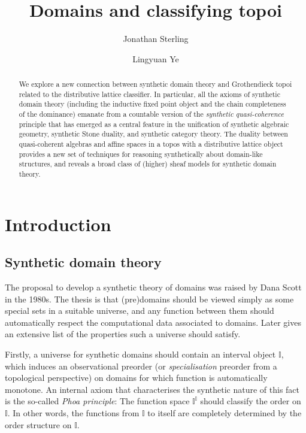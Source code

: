 \documentclass[a4paper,12pt]{amsart}
\title{Domains and classifying topoi}
\author{Jonathan Sterling}
\author{Lingyuan Ye}
\theoremstyle{definition}
\newcommand{\mbb}[1]{\mathbb{#1}}
\newcommand{\I}{\mbb I}
\begin{document}
\begin{abstract}
  We explore a new connection between synthetic domain theory and Grothendieck topoi related to the distributive lattice classifier. In particular, all the axioms of synthetic domain theory (including the inductive fixed point object and the chain completeness of the dominance) emanate from a countable version of the \emph{synthetic quasi-coherence} principle that has emerged as a central feature in the unification of synthetic algebraic geometry, synthetic Stone duality, and synthetic category theory. The duality between quasi-coherent algebras and affine spaces in a topos with a distributive lattice object provides a new set of techniques for reasoning synthetically about domain-like structures, and reveals a broad class of (higher) sheaf models for synthetic domain theory.
\end{abstract}

\maketitle
\tableofcontents


\section{Introduction}\label{sec:intro}

\subsection{Synthetic domain theory}\label{subsec:sdt}

The proposal to develop a synthetic theory of domains was raised by Dana Scott in the 1980s. The thesis is that (pre)domains should be viewed simply as some special sets in a suitable universe, and any function between them should automatically respect the computational data associated to domains. Later \citet{hyland1990first} gives an extensive list of the properties such a universe should satisfy.

Firstly, a universe for synthetic domains should contain an interval object $\I$, which induces an observational preorder (or \emph{specialisation} preorder from a topological perspective) on domains for which function is automatically monotone. An internal axiom that characterises the synthetic nature of this fact is the so-called \emph{Phoa principle}: The function space $\I^\I$ should classify the order on $\I$. In other words, the functions from $\I$ to itself are completely determined by the order structure on $\I$. 
\end{document}
